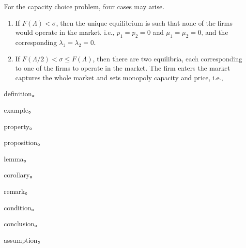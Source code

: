 \documentclass[
    writingLanguage=english, 
    addPageTitle=on,
    addDeclaration=on,
    addMUSTlog=off,
    printing=off,
    refIndent=on,
    addFigTOC=on,
    addTabTOC=on,
]{.def/must}
\begin{document}
\begin{theorem}
For the capacity choice problem, four
cases may arise.
\begin{enumerate}[itemsep=2pt,topsep=0pt,parsep=0pt,leftmargin=*,label=\emph{(\roman*)}]
    \item If $F(\Lambda)<\sigma$, then the unique equilibrium is such that none of the firms would operate in the market, i.e., $p_1=p_2=0$ and $\mu_1=\mu_2=0$, and the corresponding $\lambda_1=\lambda_2=0$.
    \item If $F(\Lambda / 2)<\sigma \leqslant F(\Lambda)$, then there are two equilibria, each corresponding to one of the firms to operate in the market. The firm enters the market captures the whole market and sets monopoly capacity and price, i.e.,
\end{enumerate}

\end{theorem}


\begin{definition}
 definition。
\end{definition}


\begin{example}
 example。
\end{example}



\begin{property}
 property。
\end{property}

\begin{proposition}
 proposition。
\end{proposition}


\begin{lemma}
 lemma。
\end{lemma}

\begin{corollary}
 corollary。
\end{corollary}

\begin{remark}
 remark。
\end{remark}



\begin{condition}
 condition。
\end{condition}



\begin{conclusion}
 conclusion。
\end{conclusion}


\begin{assumption}
 assumption。
\end{assumption}
\end{document}
